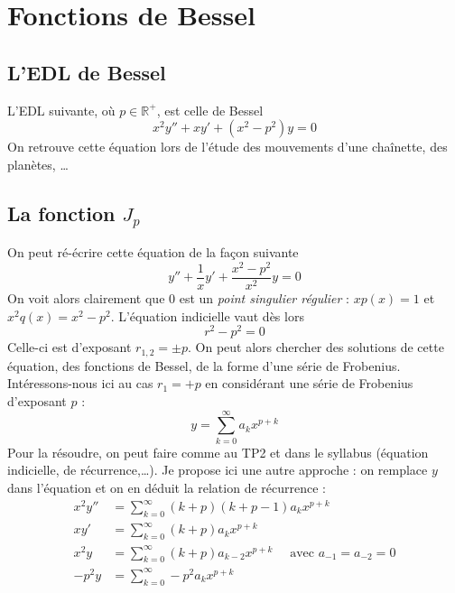 \newpage
\setcounter{section}{11}
\section{Fonctions de Bessel}
	\subsection{L'EDL de Bessel}
	L'EDL suivante, où $p\in\mathbb{R}^+$, est celle de Bessel
	\begin{equation}
	x^2y'' + xy' + (x^2-p^2)y = 0
	\end{equation}
	On retrouve cette équation lors de l'étude des mouvements d'une chaînette, des 
	planètes, \dots 
	
	\subsection{La fonction $J_p$}
	On peut ré-écrire cette équation de la façon suivante
	\begin{equation}
	y'' + \dfrac{1}{x}y' + \dfrac{x^2-p^2}{x^2}y = 0
	\end{equation}
	On voit alors clairement que $0$ est un \textit{point singulier régulier} : $xp(x) 
	= 1$ et $x^2q(x) = x^2-p^2$. L'équation indicielle vaut dès lors
	\begin{equation}
	r^2 - p^2 = 0
	\end{equation}
	Celle-ci est d'exposant $r_{1,2} = \pm p$. On peut alors chercher des solutions 
	de cette équation, des fonctions de Bessel, de la forme d'une série de Frobenius. 
	Intéressons-nous ici au cas $r_1 = +p$ en considérant une série de Frobenius 
	d'exposant $p$ :
	\begin{equation}
	y = \sum_{k=0}^\infty a_kx^{p+k}
	\end{equation}
	Pour la résoudre, on peut faire comme au TP2 et dans le syllabus (équation indicielle, 
	de récurrence,\dots). Je propose ici une autre approche : on remplace $y$ dans 
	l'équation et on en déduit la relation de récurrence :
	\begin{equation}
	\begin{array}{ll}
	x^2 y'' &= \displaystyle \sum_{k=0}^\infty (k+p)(k+p-1)a_kx^{p+k}\\
	xy' &= \displaystyle  \sum_{k=0}^\infty (k+p)a_kx^{p+k}\\
	x^2 y &= \displaystyle  \sum_{k=0}^\infty (k+p)a_{k-2}x^{p+k}\quad \text{ avec } 
	a_{-1}=a_{-2}=0\\
	-p^2 y &= \displaystyle \sum_{k=0}^\infty -p^2 a_kx^{p+k}
	\end{array}
	\end{equation}

